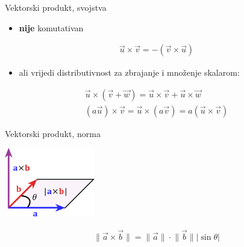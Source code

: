 \documentclass[9pt]{beamer}
\begin{document}
\begin{frame}{Vektorski produkt, svojstva}
	\begin{itemize}
		\item \textbf{nije} komutativan
	\end{itemize}
	\begin{align*}
	\vec{u} \times \vec{v} = -(\vec{v} \times \vec{u})
	\end{align*}
	\begin{itemize}
		\item ali vrijedi distributivnost za zbrajanje i množenje skalarom:
	\end{itemize}
	\begin{align*}
		\vec{u} \times (\vec{v} + \vec{w}) = \vec{u} \times \vec{v} + \vec{u} \times \vec{w} \\
		(a\vec{u}) \times \vec{v} = \vec{u} \times (a\vec{v}) = a (\vec{u} \times \vec{v})
	\end{align*}
\end{frame}

\begin{frame}{Vektorski produkt, norma}
	\begin{center}
		\includegraphics[height=3cm]{./slike/linear_algebra_cross_product_wiki.png}
	\end{center}

	\begin{align*}
	\lVert \vec{a} \times \vec{b} \rVert = \lVert \vec{a} \rVert \cdot \lVert \vec{b} \rVert |\sin \theta|
	\end{align*}
\end{frame}	
\end{document}
